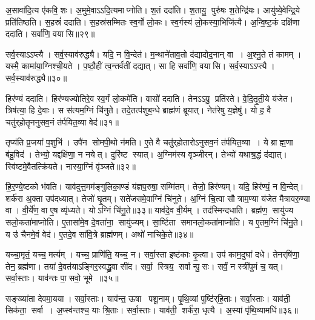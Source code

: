    अ॒सावा॑दि॒त्य ए॑कवि॒शः।
   अ॒मुमे॒वाऽऽदि॒त्यमाप्नोति।
   श॒तं ददा॑ति।
   श॒तायु॒ पुरु॑षः श॒तेन्द्रि॑यः।
   आयु॑ष्ये॒वेन्द्रि॒ये प्रति॑तिष्ठति।
   स॒हस्रं॑ ददाति।
   स॒हस्र॑सम्मितः स्व॒र्गो लो॒कः।
   स्व॒र्गस्य॑ लो॒कस्या॒भिजि॑त्यै।
   अ॒न्वि॒ष्ट॒कं दक्षि॑णा ददाति।
   सर्वा॑णि॒ वयासि॥२९॥

   सर्व॒स्याऽऽप्त्यै।
   सर्व॒स्याव॑रुद्ध्यै।
   यदि॒ न वि॒न्देत॑।
   म॒न्थाने॑ताव॒तो द॑द्यादोद॒नान् वा।
   अ॒श्नु॒ते तं कामम्।
   यस्मै॒ कामा॑या॒ग्निश्ची॒यते।
   प॒ष्ठौ॒हीं त्व॒न्तर्व॑तीं दद्यात्।
   सा हि सर्वा॑णि॒ वयासि।
   सर्व॒स्याऽऽप्त्यै।
   सर्व॒स्याव॑रुद्ध्यै॥३०॥

   हिर॑ण्यं ददाति।
   हिर॑ण्यज्योतिरे॒व स्व॒र्गं लो॒कमे॑ति।
   वासो॑ ददाति।
   तेनऽऽयु॒ प्रति॑रते।
   वे॒दि॒तृ॒ती॒ये य॑जेत।
   त्रिष॑त्या॒ हि दे॒वाः।
   स स॑त्यम॒ग्निं चि॑नुते।
   तदे॒तत्प॑शुब॒न्धे ब्राह्म॑णं ब्रूयात्।
   नेत॑रेषु य॒ज्ञेषु॑।
   यो ह॒ वै चतु॑र्‌होतॄननुसव॒नं त॑र्पयित॒व्या\sn{} वेद॑॥३१॥

   तृप्य॑ति प्र॒जया॑ प॒शुभि॑।
   उपै॑न सोमपी॒थो न॑मति।
   ए॒ते वै चतु॑र्‌होतारोऽनुसव॒नं त॑र्पयित॒व्या।
   ये ब्राह्म॒णा ब॑हु॒विद॑।
   तेभ्यो॒ यद्दक्षि॑णा॒ न नयेत्।
   दुरि॑ष्ट स्यात्।
   अ॒ग्निम॑स्य वृञ्जीरन्।
   तेभ्यो॑ यथाश्र॒द्धं द॑द्यात्।
   स्वि॑ष्टमे॒वैतत्क्रि॑यते।
   नास्या॒ग्निं वृ॑ञ्जते॥३२॥

   हि॒र॒ण्ये॒ष्टको भ॑वति।
   याव॑दुत्त॒मम॑ङ्गुलिका॒ण्डं य॑ज्ञप॒रुषा॒ सम्मि॑तम्।
   तेजो॒ हिर॑ण्यम्।
   यदि॒ हिर॑ण्यं॒ न वि॒न्देत्।
   शर्क॑रा अ॒क्ता उप॑दध्यात्।
   तेजो॑ घृ॒तम्।
   सते॑जसमे॒वाग्निं चि॑नुते।
   अ॒ग्निं चि॒त्वा सौत्राम॒ण्या य॑जेत मैत्रावरु॒ण्या वा।
   वी॒र्ये॑ण॒ वा ए॒ष व्यृ॑ध्यते।
   योऽग्निं चि॑नु॒ते॥३३॥
   याव॑दे॒व वी॒र्यम्।
   तद॑स्मिन्दधाति।
   ब्रह्म॑ण॒ सायु॑ज्य सलो॒कता॑माप्नोति।
   ए॒तासा॑मे॒व दे॒वता॑ना॒ सायु॑ज्यम्।
   सा॒र्ष्टिता समानलो॒कता॑माप्नोति।
   य ए॒तम॒ग्निं चि॑नु॒ते।
   य उ॑ चैनमे॒वं वेद॑।
   ए॒तदे॒व सा॑वि॒त्रे ब्राह्म॑णम्।
   अथो॑ नाचिके॒ते॥३४॥
   \anuvakamend
  
   यच्चा॒मृतं॒ यच्च॒ मर्त्यम्।
   यच्च॒ प्राणि॑ति॒ यच्च॒ न।
   सर्वा॒स्ता इष्ट॑काः कृ॒त्वा।
   उप॑ काम॒दुघा॑ दधे।
   तेनर्‌षि॑णा॒ तेन॒ ब्रह्म॑णा।
   तया॑ दे॒वत॑याऽङ्गिर॒स्वद्ध्रु॒वा सी॑द।
   सर्वा॒ स्त्रिय॒ सर्वान्पु॒सः।
   सर्वं॒ न स्त्री॑पुमं च॒ यत्।
   सर्वा॒स्ताः।
   याव॑न्तः पा॒सवो॒ भूमे॥३५॥

   सङ्ख्या॑ता देवमा॒यया।
   सर्वा॒स्ताः।
   याव॑न्त॒ ऊषा पशू॒नाम्।
   पृ॒थि॒व्यां पुष्टि॑र्‌हि॒ताः।
   सर्वा॒स्ताः।
   याव॑ती॒ सिक॑ता॒ सर्वा।
   अ॒प्स्व॑न्तश्च॒ याः श्रि॒ताः।
   सर्वा॒स्ताः।
   याव॑ती॒ शर्क॑रा॒ धृत्यै।
   अ॒स्यां पृ॑थि॒व्यामधि॑॥३६॥	

